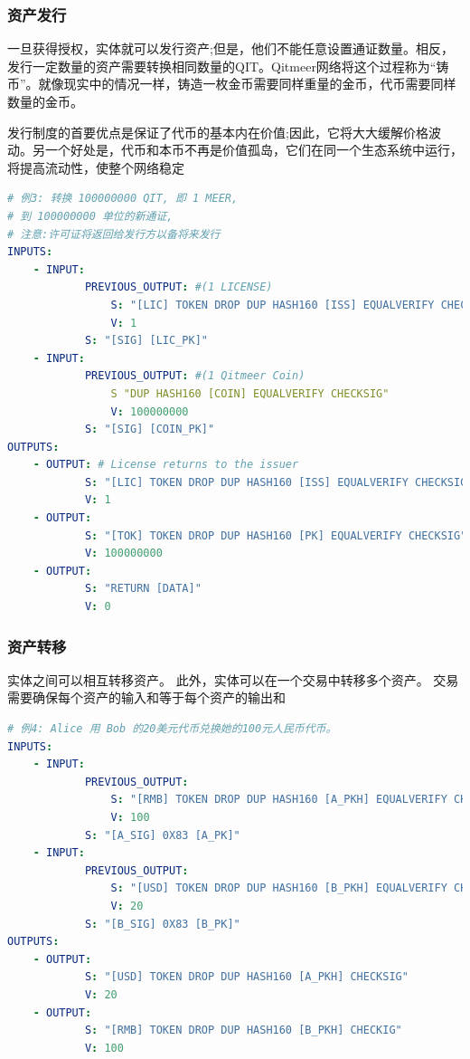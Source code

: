 \documentclass[a4paper,11pt]{article}
\begin{document}
\subsubsection{资产发行}
一旦获得授权，实体就可以发行资产;但是，他们不能任意设置通证数量。相反，发行一定数量的资产需要转换相同数量的QIT。Qitmeer网络将这个过程称为“铸币”。就像现实中的情况一样，铸造一枚金币需要同样重量的金币，代币需要同样数量的金币。

发行制度的首要优点是保证了代币的基本内在价值;因此，它将大大缓解价格波动。另一个好处是，代币和本币不再是价值孤岛，它们在同一个生态系统中运行，将提高流动性，使整个网络稳定

\lstset{basicstyle=\tiny,style=myListStyle}
\begin{lstlisting}[language=yaml, numbers=none,basicstyle=\footnotesize]
# 例3: 转换 100000000 QIT, 即 1 MEER,
# 到 100000000 单位的新通证,
# 注意:许可证将返回给发行方以备将来发行
INPUTS:
	- INPUT:
			PREVIOUS_OUTPUT: #(1 LICENSE)
				S: "[LIC] TOKEN DROP DUP HASH160 [ISS] EQUALVERIFY CHECKSIG"
				V: 1
			S: "[SIG] [LIC_PK]"
	- INPUT:
			PREVIOUS_OUTPUT: #(1 Qitmeer Coin)
				S "DUP HASH160 [COIN] EQUALVERIFY CHECKSIG"
				V: 100000000
			S: "[SIG] [COIN_PK]"
OUTPUTS:
	- OUTPUT: # License returns to the issuer
			S: "[LIC] TOKEN DROP DUP HASH160 [ISS] EQUALVERIFY CHECKSIG"
			V: 1
	- OUTPUT:
			S: "[TOK] TOKEN DROP DUP HASH160 [PK] EQUALVERIFY CHECKSIG"
			V: 100000000
	- OUTPUT:
			S: "RETURN [DATA]"
			V: 0
\end{lstlisting}

\subsubsection{资产转移}

实体之间可以相互转移资产。
此外，实体可以在一个交易中转移多个资产。
交易需要确保每个资产的输入和等于每个资产的输出和

\lstset{basicstyle=\tiny,style=myListStyle}
\begin{lstlisting}[language=yaml, numbers=none,basicstyle=\footnotesize]
# 例4: Alice 用 Bob 的20美元代币兑换她的100元人民币代币。
INPUTS:
	- INPUT:
			PREVIOUS_OUTPUT:
				S: "[RMB] TOKEN DROP DUP HASH160 [A_PKH] EQUALVERIFY CHECKSIG"
				V: 100
			S: "[A_SIG] 0X83 [A_PK]"
	- INPUT:
			PREVIOUS_OUTPUT:
				S: "[USD] TOKEN DROP DUP HASH160 [B_PKH] EQUALVERIFY CHECKSIG"
				V: 20
			S: "[B_SIG] 0X83 [B_PK]"
OUTPUTS:
	- OUTPUT:
			S: "[USD] TOKEN DROP DUP HASH160 [A_PKH] CHECKSIG"
			V: 20
	- OUTPUT:
			S: "[RMB] TOKEN DROP DUP HASH160 [B_PKH] CHECKIG"
			V: 100
\end{lstlisting}
\end{document}
